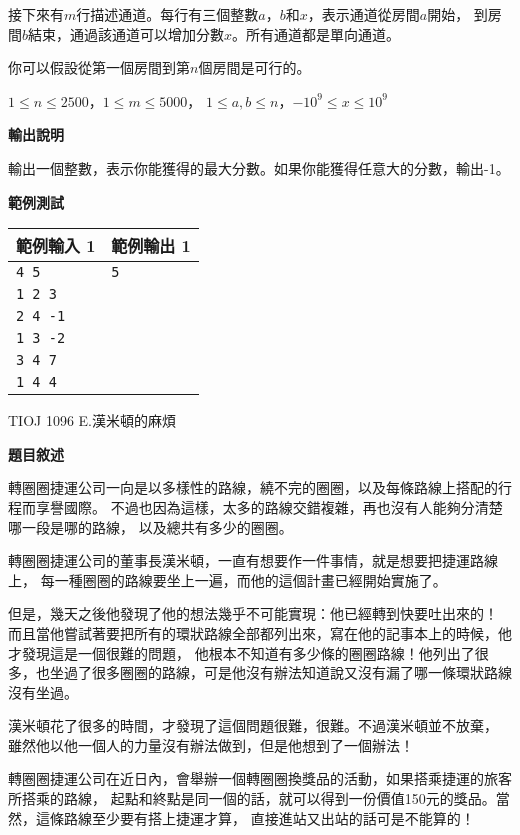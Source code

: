     接下來有$m$行描述通道。每行有三個整數$a$，$b$和$x$，表示通道從房間$a$開始，
    到房間$b$結束，通過該通道可以增加分數$x$。所有通道都是單向通道。

    你可以假設從第一個房間到第$n$個房間是可行的。

    $1 \leq n \leq 2500$，$1 \leq m \leq 5000$，
    $1 \leq a, b \leq n$，$-10^9 \leq x \leq 10^9$

    \textbf{輸出說明}

    輸出一個整數，表示你能獲得的最大分數。如果你能獲得任意大的分數，輸出-1。

    \textbf{範例測試}

    \begin{tabular}{|m{7cm}|m{7cm}|}
        \hline
        範例輸入 1 & 範例輸出 1 \\
        \hline
        \verb|4 5| & \verb|5| \\
        \verb|1 2 3| & \\
        \verb|2 4 -1| & \\
        \verb|1 3 -2| & \\
        \verb|3 4 7| & \\
        \verb|1 4 4| & \\
        \hline
    \end{tabular}

    \problem TIOJ 1096 E.漢米頓的麻煩

    \textbf{題目敘述}

    轉圈圈捷運公司一向是以多樣性的路線，繞不完的圈圈，以及每條路線上搭配的行程而享譽國際。
    不過也因為這樣，太多的路線交錯複雜，再也沒有人能夠分清楚哪一段是哪的路線，
    以及總共有多少的圈圈。

    轉圈圈捷運公司的董事長漢米頓，一直有想要作一件事情，就是想要把捷運路線上，
    每一種圈圈的路線要坐上一遍，而他的這個計畫已經開始實施了。

    但是，幾天之後他發現了他的想法幾乎不可能實現：他已經轉到快要吐出來的！
    而且當他嘗試著要把所有的環狀路線全部都列出來，寫在他的記事本上的時候，他才發現這是一個很難的問題，
    他根本不知道有多少條的圈圈路線！他列出了很多，也坐過了很多圈圈的路線，可是他沒有辦法知道說又沒有漏了哪一條環狀路線沒有坐過。

    漢米頓花了很多的時間，才發現了這個問題很難，很難。不過漢米頓並不放棄，
    雖然他以他一個人的力量沒有辦法做到，但是他想到了一個辦法！

    轉圈圈捷運公司在近日內，會舉辦一個轉圈圈換獎品的活動，如果搭乘捷運的旅客所搭乘的路線，
    起點和終點是同一個的話，就可以得到一份價值150元的獎品。當然，這條路線至少要有搭上捷運才算，
    直接進站又出站的話可是不能算的！


